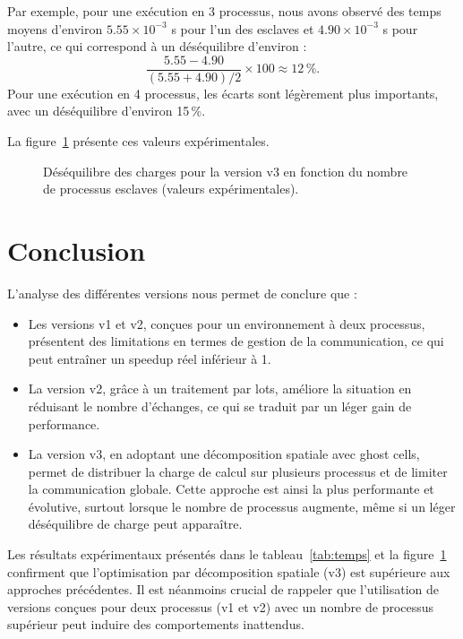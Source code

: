 \documentclass[a4paper,13pt]{book}
\begin{document}
Par exemple, pour une exécution en 3 processus, nous avons observé des temps moyens d'environ \(5.55 \times 10^{-3}\) s pour l'un des esclaves et \(4.90 \times 10^{-3}\) s pour l'autre, ce qui correspond à un déséquilibre d'environ :
\[
\frac{5.55-4.90}{(5.55+4.90)/2} \times 100 \approx 12\,\%.
\]
Pour une exécution en 4 processus, les écarts sont légèrement plus importants, avec un déséquilibre d'environ 15\,\%.

La figure~\ref{fig:imbalance} présente ces valeurs expérimentales.

\begin{figure}[ht]
  \centering
  \caption{Déséquilibre des charges pour la version v3 en fonction du nombre de processus esclaves (valeurs expérimentales).}
  \label{fig:imbalance}
\end{figure}


\section{Conclusion}

L'analyse des différentes versions nous permet de conclure que :

\begin{itemize}
  \item Les versions v1 et v2, conçues pour un environnement à deux processus, présentent des limitations en termes de gestion de la communication, ce qui peut entraîner un speedup réel inférieur à 1.
  \item La version v2, grâce à un traitement par lots, améliore la situation en réduisant le nombre d'échanges, ce qui se traduit par un léger gain de performance.
  \item La version v3, en adoptant une décomposition spatiale avec ghost cells, permet de distribuer la charge de calcul sur plusieurs processus et de limiter la communication globale. Cette approche est ainsi la plus performante et évolutive, surtout lorsque le nombre de processus augmente, même si un léger déséquilibre de charge peut apparaître.
\end{itemize}

Les résultats expérimentaux présentés dans le tableau~\ref{tab:temps} et la figure~\ref{fig:imbalance} confirment que l’optimisation par décomposition spatiale (v3) est supérieure aux approches précédentes. Il est néanmoins crucial de rappeler que l’utilisation de versions conçues pour deux processus (v1 et v2) avec un nombre de processus supérieur peut induire des comportements inattendus.
\end{document}
